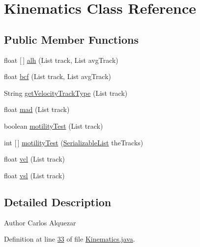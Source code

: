 \hypertarget{classfunctions_1_1_kinematics}{}\section{Kinematics Class Reference}
\label{classfunctions_1_1_kinematics}
\subsection*{Public Member Functions}
\begin{DoxyCompactItemize}
\item 
float \mbox{[}$\,$\mbox{]} \hyperlink{classfunctions_1_1_kinematics_a8f8221f314e814927fb192ea65f2af4a}{alh} (List track, List avg\+Track)
\item 
float \hyperlink{classfunctions_1_1_kinematics_ac35b9a912f923321eee5335c011f7c89}{bcf} (List track, List avg\+Track)
\item 
String \hyperlink{classfunctions_1_1_kinematics_a55fee1cc65c19a5862bd9fdce3aa9cd5}{get\+Velocity\+Track\+Type} (List track)
\item 
float \hyperlink{classfunctions_1_1_kinematics_a2b60196aad8d0eecb1c3048e0163ebc3}{mad} (List track)
\item 
boolean \hyperlink{classfunctions_1_1_kinematics_a5dbef047c19d4c554b08ba879eb7443f}{motility\+Test} (List track)
\item 
int \mbox{[}$\,$\mbox{]} \hyperlink{classfunctions_1_1_kinematics_a0bde63a25091ffc7c7af6d9fffe78034}{motility\+Test} (\hyperlink{classdata_1_1_serializable_list}{Serializable\+List} the\+Tracks)
\item 
float \hyperlink{classfunctions_1_1_kinematics_af6e1e75567a927a9c627616cb68b0d7f}{vcl} (List track)
\item 
float \hyperlink{classfunctions_1_1_kinematics_a938c4a9daa152f426259a01bc6654b25}{vsl} (List track)
\end{DoxyCompactItemize}


\subsection{Detailed Description}
\begin{DoxyAuthor}{Author}
Carlos Alquezar 
\end{DoxyAuthor}


Definition at line \hyperlink{_kinematics_8java_source_l00033}{33} of file \hyperlink{_kinematics_8java_source}{Kinematics.\+java}.



